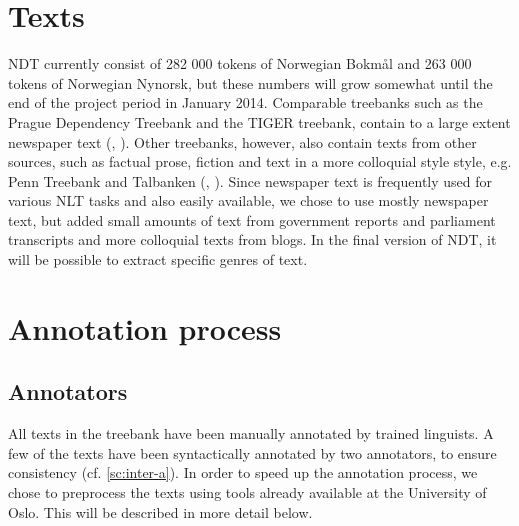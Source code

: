 \documentclass[11pt,a4paper]{article}
\begin{document}

\section{Texts}
NDT currently consist of 282 000 tokens of Norwegian Bokmål and 263 000 tokens of Norwegian Nynorsk, but these numbers will grow somewhat until the end of the project period in January 2014. Comparable treebanks such as the Prague Dependency Treebank and the TIGER treebank, contain to a large extent newspaper text (\cite{Boh:Haj:Hla:2003}, \cite{Bra:2004}). Other treebanks, however, also contain texts from other sources, such as factual prose, fiction and text in a more colloquial style style, e.g. Penn Treebank and Talbanken (\cite{Mar:San:Mar:09}, \cite{Niv:Nil:Hal:2006}). Since newspaper text is frequently used for various NLT tasks and also easily available, we chose to use mostly newspaper text, but added small amounts of text from government reports and parliament transcripts and more colloquial texts from blogs. In the final version of NDT, it will be possible to extract specific genres of text.



\section{Annotation process}
\subsection{Annotators}
All texts in the treebank have been manually annotated by trained linguists. A few of the texts have been syntactically annotated by two annotators, to ensure consistency (cf. \ref{sc:inter-a}). In order to speed up the annotation process, we chose to preprocess the texts using tools already available at the University of Oslo. This will be described in more detail below.
\end{document}
